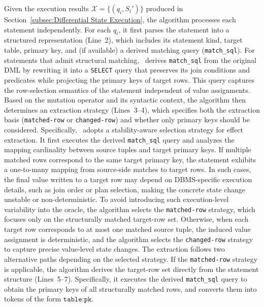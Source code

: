 Given the execution results $\mathcal{X} = \{(q_i, S_i')\}$ produced in Section~\ref{subsec:Differential State Execution}, the algorithm processes each statement independently.
For each $q_i$, it first parses the statement into a structured representation (Line~2), which includes its statement kind, target table, primary key, and (if available) a derived matching query (\texttt{match\_sql}).
%
For statements that admit structural matching, \toolname\ derives \texttt{match\_sql} from the original DML by rewriting it into a \texttt{SELECT} query that preserves its join conditions and predicates while projecting the primary keys of target rows.
This query captures the row-selection semantics of the statement independent of value assignments.
%
Based on the mutation operator and its syntactic context, the algorithm then determines an extraction strategy (Lines~3--4), which specifies both the extraction basis (\texttt{matched-row} or \texttt{changed-row}) and whether only primary keys should be considered.
Specifically, \toolname\ adopts a stability-aware selection strategy for effect extraction.
It first executes the derived \texttt{match\_sql} query and analyzes the mapping cardinality between source tuples and target primary keys.
If multiple matched rows correspond to the same target primary key, the statement exhibits a one-to-many mapping from source-side matches to target rows.
In such cases, the final value written to a target row may depend on DBMS-specific execution details, such as join order or plan selection, making the concrete state change unstable or non-deterministic.
To avoid introducing such execution-level variability into the oracle, the algorithm selects the \texttt{matched-row} strategy, which focuses only on the structurally matched target-row set.
Otherwise, when each target row corresponds to at most one matched source tuple, the induced value assignment is deterministic, and the algorithm selects the \texttt{changed-row} strategy to capture precise value-level state changes.
The extraction follows two alternative paths depending on the selected strategy.
If the \texttt{matched-row} strategy is applicable, the algorithm derives the target-row set directly from the statement structure (Lines~5--7).
Specifically, it executes the derived \texttt{match\_sql} query to obtain the primary keys of all structurally matched rows, and converts them into tokens of the form $\texttt{table:pk}$.
